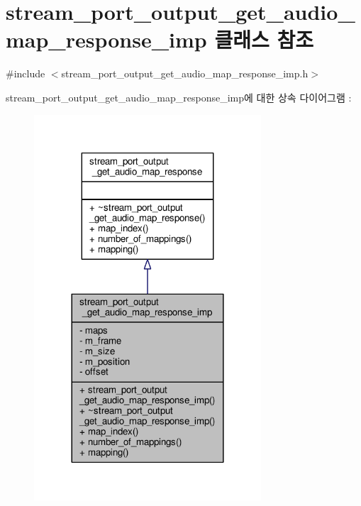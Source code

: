\hypertarget{classavdecc__lib_1_1stream__port__output__get__audio__map__response__imp}{}\section{stream\+\_\+port\+\_\+output\+\_\+get\+\_\+audio\+\_\+map\+\_\+response\+\_\+imp 클래스 참조}
\label{classavdecc__lib_1_1stream__port__output__get__audio__map__response__imp}


{\ttfamily \#include $<$stream\+\_\+port\+\_\+output\+\_\+get\+\_\+audio\+\_\+map\+\_\+response\+\_\+imp.\+h$>$}



stream\+\_\+port\+\_\+output\+\_\+get\+\_\+audio\+\_\+map\+\_\+response\+\_\+imp에 대한 상속 다이어그램 \+: 
\nopagebreak
\begin{figure}[H]
\begin{center}
\leavevmode
\includegraphics[width=240pt]{classavdecc__lib_1_1stream__port__output__get__audio__map__response__imp__inherit__graph}
\end{center}
\end{figure}


